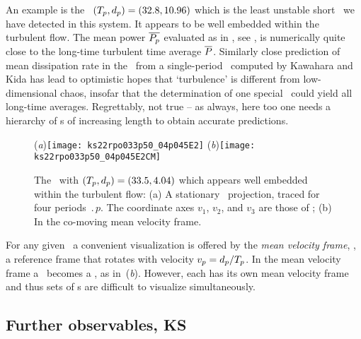 An example is the \rpo\ $({T_{p}},d_p) = (32.8,10.96)$
which {is the least unstable short \rpo\ we have detected in this system.
It} appears to be well embedded within the turbulent flow. The mean power
$\overline{P_p}$ evaluated as in , see ,
is numerically quite close to the long-time turbulent time average
$\overline{P}$. Similarly close prediction of mean dissipation rate in
the \pCf\ from a single-period \po\ computed by Kawahara and
Kida has lead to optimistic hopes that `turbulence' is
different from low-dimensional chaos, insofar that the determination of
one special \po\ could yield all long-time averages. Regrettably, not
true -- as always, here too one needs a hierarchy of \po s of increasing
length to obtain accurate predictions.

\begin{figure}[t]
\begin{center}
(\textit{a})\texttt{[image: ks22rpo033p50\_04p045E2]}
(\textit{b})\texttt{[image: ks22rpo033p50\_04p045E2CM]}
\\
\end{center}
\caption{
 The
\rpo\ with $({T_{p}},d_p) =(33.5,4.04)$
which appears well embedded within the turbulent flow:
 (a) A stationary \statesp\ projection,
  traced for four periods $\period{p}$. The coordinate axes
$v_1$, $v_2$, and $v_3$ are those of ;
 (b) In the co-moving mean velocity frame.
        } \label{f:MeanVelocityFrame}
\end{figure}

For any given \rpo\ a convenient visualization is
offered by the {\em mean velocity frame}, {\ie},
a reference frame that rotates with velocity
$v_p=d_p/{T_{p}}$.
In the mean velocity frame a \rpo\ becomes
a \po, as in \,(\textit{b}).
However, each {\rpo} has its own mean velocity frame and thus
sets of \rpo s are difficult to visualize simultaneously.

\subsection{Further observables, KS}
\label{sec:moreObs}

